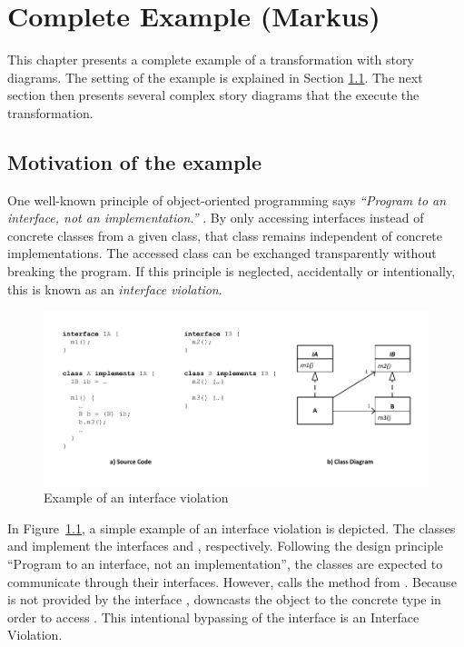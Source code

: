 \chapter{Complete Example (Markus)}

This chapter presents a complete example of a transformation with story diagrams. The setting of the example is explained in Section \ref{sec:Example:Motivation}. The next section then presents several complex story diagrams that the execute the transformation.

\section{Motivation of the example}
\label{sec:Example:Motivation}

One well-known principle of object-oriented programming says \emph{``Program to an interface, not an implementation.''} \cite{GHJV95}. By only accessing interfaces instead of concrete classes from a given class, that class remains independent of concrete implementations. The accessed class can be exchanged transparently without breaking the program. If this principle is neglected, accidentally or intentionally, this is known as an \emph{interface violation}.

\begin{figure}[hbtp]
\centering
\includegraphics[width=\linewidth]{./figures/InterfaceViolation}
\caption{Example of an interface violation}
\label{fig:InterfaceViolationExample}
\end{figure}

In Figure~\ref{fig:InterfaceViolationExample}, a simple example of an interface violation is depicted. The classes  and  implement the interfaces  and , respectively. Following the design principle ``Program to an interface, not an implementation'', the classes are expected to communicate through their interfaces. However,  calls the method  from . Because  is not provided by the interface ,  downcasts the object  to the concrete type  in order to access . This intentional bypassing of the interface  is an Interface Violation.

